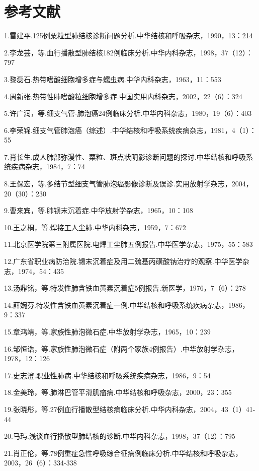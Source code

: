 \protect\hypertarget{text00087.html}{}{}

\section{参考文献}

1.雷建平.125例粟粒型肺结核诊断问题分析.中华结核和呼吸杂志，1990，13：214

2.李龙芸，等.血行播散型肺结核182例临床分析.中华内科杂志，1998，37（12）：797

3.黎磊石.热带嗜酸细胞增多症与蠕虫病.中华内科杂志，1963，11：553

4.周新张.热带性肺嗜酸粒细胞增多症.中国实用内科杂志，2002，22（6）：324

5.许广润，等.细支气管-肺泡癌24例临床分析.中华内科杂志，1980，19（6）：403

6.李荣锦.细支气管肺泡癌（综述）.中华结核和呼吸系统疾病杂志，1981，4（1）：55

7.肖长生.成人肺部弥漫性、粟粒、斑点状阴影诊断问题的探讨.中华结核和呼吸系统疾病杂志，1984，7：74

8.王保宏，等.多结节型细支气管肺泡癌影像诊断及误诊.实用放射学杂志，2004，20（30）：230

9.曹来宾，等.肺钡末沉着症.中华放射学杂志，1965，10：108

10.王之桐，等.焊接工人尘肺.中华内科杂志，1959，7：672

11.北京医学院第三附属医院.电焊工尘肺五例报告.中华医学杂志，1975，55：583

12.广东省职业病防治院.锡末沉着症及用二巯基丙磺酸钠治疗的观察.中华医学杂志，1974，54：435

13.汤鼎铭，等.特发性肺含铁血黄素沉着症5例报告.新医学，1976，7（6）：278

14.薛婉芬.特发性含铁血黄素沉着症一例.中华结核和呼吸系统疾病杂志，1986，9：337

15.章鸿靖，等.家族性肺泡微石症.中华放射学杂志，1965，10：239

16.邹恒诰，等.家族性肺泡微石症（附两个家族4例报告）.中华放射学杂志，1978，12：126

17.史志澄.职业性肺病.中华结核和呼吸系统疾病杂志，1986，9：54

18.金美玲，等.肺淋巴管平滑肌瘤病.中华结核和呼吸杂志，2000，23：355

19.张晓彤，等.27例血行播散型结核病临床分析.中华内科杂志，2004，43（1）41-44

20.马玙.浅谈血行播散型肺结核的诊断.中华内科杂志，1998，37（12）：795

21.肖正伦，等.78例重症急性呼吸综合征病例临床分析.中华结核和呼吸杂志，2003，26（6）：334-338

